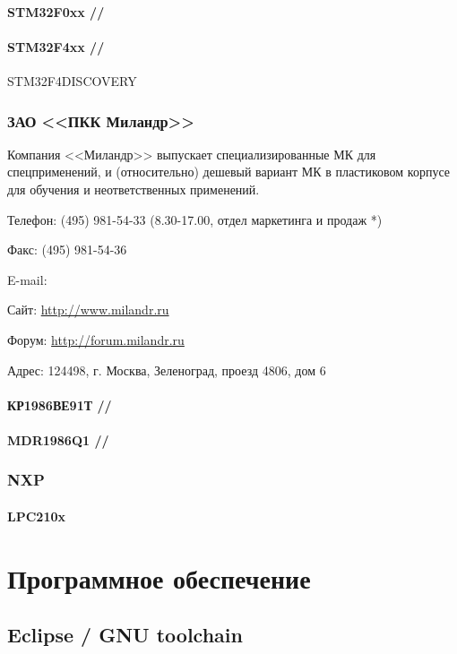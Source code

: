 \documentclass[oneside,12pt]{book}
\begin{document}
\subsection{STM32F0xx //}

\subsection{STM32F4xx //} STM32F4DISCOVERY
\section{ЗАО <<ПКК Миландр>>}

Компания <<Миландр>> выпускает специализированные МК для спецприменений,
и (относительно) дешевый вариант МК в пластиковом корпусе для обучения
и неответственных применений.

\bigskip

Телефон: (495) 981-54-33 (8.30-17.00, отдел маркетинга и продаж *)

Факс: (495) 981-54-36

E-mail: 

Сайт: \url{http://www.milandr.ru}

Форум: \url{http://forum.milandr.ru}

Адрес: 124498, г. Москва, Зеленоград, проезд 4806, дом 6

\subsection{КР1986ВЕ91Т //}
\subsection{MDR1986Q1 //}
\section{NXP}
\subsection{LPC210x}

\part{Программное обеспечение}


\chapter{Eclipse / GNU toolchain}
\end{document}
